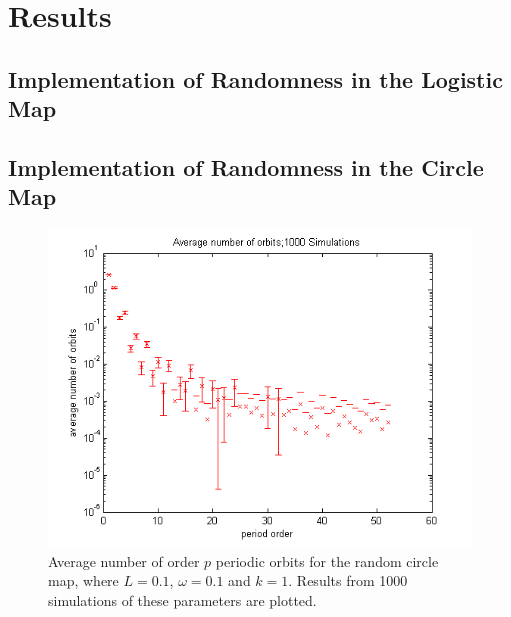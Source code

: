\chapter{Results}
\section{Implementation of Randomness in the Logistic Map}
\section{Implementation of Randomness in the Circle Map}
\begin{figure}[!h]
\caption[Average number of order $p$ orbits for the random
circle map]{Average number of order $p$ periodic orbits for the random
circle map, where $L=0.1$, $\omega =0.1$ and $k=1$. Results from 1000
simulations of these parameters are plotted.}
	\begin{center}
		\includegraphics[scale=0.7]{figs/rcirc_avg_num_1000_sim_logscale.png}
	\end{center}
\end{figure}

